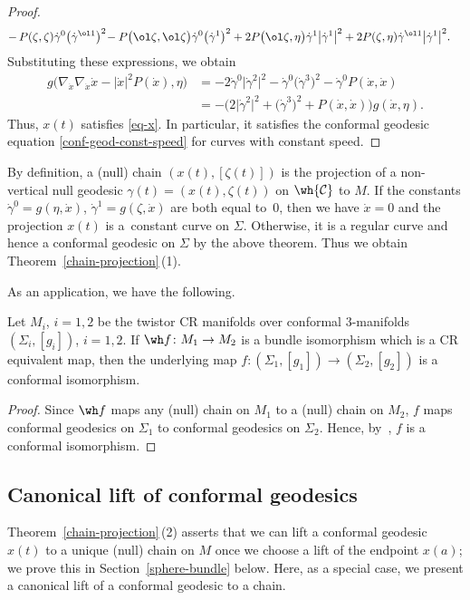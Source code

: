 \begin{proof}
\begin{align*}
&{}{-}\, P(\zeta, \zeta) \dot\gamma^0\bigl(\dot\gamma^{\ol1}\bigr)^2\!-P\bigl(\ol\zeta, \ol\zeta\bigr) \dot\gamma^0\bigl(\dot\gamma^{1}\bigr)^2+2P\bigl(\ol\zeta, \eta\bigr)\dot\gamma^1\bigl|\dot\gamma^1\bigr|^2
 + 2P(\zeta, \eta)\dot\gamma^{\ol1}\bigl|\dot\gamma^1\bigr|^2.
\end{align*}
Substituting these expressions, we obtain
\begin{align*}
g\bigl(\nabla_{\dot x}\nabla_{\dot x}\dot x-|\dot x|^2P(\dot x) ,\eta\bigr)
&=-2\dot\gamma^0\bigl|\dot\gamma^2\bigr|^2-\dot\gamma^0\bigl(\dot\gamma^3\bigr)^2-\dot\gamma^0P(\dot x, \dot x) \\
&=-\bigl(2\bigl|\dot\gamma^2\bigr|^2+\bigl(\dot\gamma^3\bigr)^2+P(\dot x, \dot x)\bigr)g(\dot x, \eta).
\end{align*}
Thus, $x(t)$ satisfies \eqref{eq-x}. In particular, it satisfies the conformal geodesic equation \eqref{conf-geod-const-speed} for curves with constant speed.
\end{proof}

By definition, a (null) chain $(x(t), [\zeta(t)])$ is the projection of a non-vertical null geodesic $\gamma(t)=(x(t), \zeta(t))$ on $\wh{\mathcal{C}}$ to $M$. If the constants $\dot\gamma^0=g(\eta, \dot x)$,
$\dot\gamma^1=g(\zeta, \dot x)$ are both equal to~0, then we have $\dot x=0$ and the projection $x(t)$ is a~constant curve on $\Sigma$. Otherwise, it is a regular curve and hence a conformal geodesic on $\Sigma$ by the above theorem. Thus we obtain Theorem~\ref{chain-projection}\,(1).

As an application, we have the following.

\begin{Theorem}[cf.\ \cite{SY}]
Let $M_i$, $i=1, 2$ be the twistor CR manifolds over conformal $3$-manifolds $(\Sigma_i, [g_i])$, $i=1, 2$. If $\wh f\colon M_1\to M_2$ is a bundle isomorphism which is a CR equivalent map, then the underlying map $f\colon (\Sigma_1, [g_1])\to (\Sigma_2, [g_2])$ is a conformal isomorphism.
\end{Theorem}
\begin{proof}
Since $\wh f$ maps any (null) chain on $M_1$ to a (null) chain on $M_2$, $f$ maps conformal geodesics on $\Sigma_1$ to conformal geodesics on $\Sigma_2$. Hence, by~\cite[Theorem 2.3]{Kuo}, $f$ is a conformal isomorphism.
\end{proof}

\subsection{Canonical lift of conformal geodesics}\label{lift}
Theorem~\ref{chain-projection}\,(2) asserts that we can lift a conformal geodesic $x(t)$ to a unique (null) chain on $M$ once we choose a lift of the endpoint $x(a)$; we prove this in Section~\ref{sphere-bundle} below.
Here, as a special case, we present a canonical lift of a conformal geodesic to a chain.

